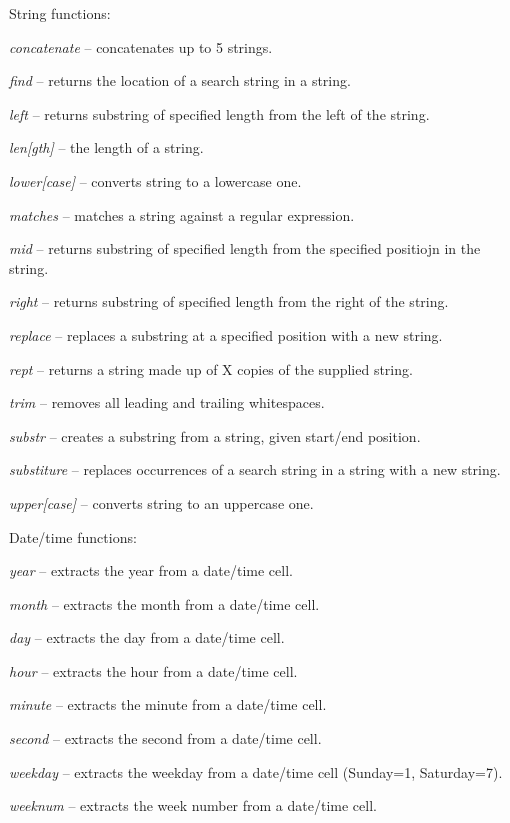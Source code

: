 \documentclass[a4paper]{book}
\begin{document}
\noindent String functions:
\begin{tight_itemize}
	\item \textit{concatenate} -- concatenates up to 5 strings.
	\item \textit{find} -- returns the location of a search string in a string.
	\item \textit{left} -- returns substring of specified length from the left of the string.
	\item \textit{len[gth]} -- the length of a string.
	\item \textit{lower[case]} -- converts string to a lowercase one.
	\item \textit{matches} -- matches a string against a regular expression.
	\item \textit{mid} -- returns substring of specified length from the specified positiojn in the string.
	\item \textit{right} -- returns substring of specified length from the right of the string.
	\item \textit{replace} -- replaces a substring at a specified position with a new string.
	\item \textit{rept} -- returns a string made up of X copies of the supplied string.
	\item \textit{trim} -- removes all leading and trailing whitespaces.
	\item \textit{substr} -- creates a substring from a string, given start/end position.
	\item \textit{substiture} -- replaces occurrences of a search string in a string with a new string.
	\item \textit{upper[case]} -- converts string to an uppercase one.
\end{tight_itemize}

\noindent Date/time functions:
\begin{tight_itemize}
	\item \textit{year} -- extracts the year from a date/time cell.
	\item \textit{month} -- extracts the month from a date/time cell.
	\item \textit{day} -- extracts the day from a date/time cell.
	\item \textit{hour} -- extracts the hour from a date/time cell.
	\item \textit{minute} -- extracts the minute from a date/time cell.
	\item \textit{second} -- extracts the second from a date/time cell.
	\item \textit{weekday} -- extracts the weekday from a date/time cell (Sunday=1, Saturday=7).
	\item \textit{weeknum} -- extracts the week number from a date/time cell.
\end{tight_itemize}
\end{document}
